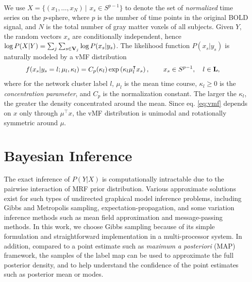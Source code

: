 \documentclass[review,authoryear]{elsarticle}
\begin{document}
We use $ X = \{ (x_1, \dots, x_N)\, |\, \ x_s \in S^{p-1} \}$ to denote the set
of \emph{normalized} time series on the $p$-sphere, where $p$ is the number of time
points in the original BOLD signal, and $N$ is the total number of gray matter
voxels of all subjects. Given $Y$, the random vectors $ x_s$ are conditionally
independent, hence $\log P( X | Y) = \sum_j \sum_{s \in \text{\bf V}_j} \log P (x_s | y_s)$.
The likelihood function $P( x_s | y_s)$ is naturally modeled by a vMF
distribution
\begin{align}
 f ( x_s| y_s = l; \mu_l, \kappa_l) &= C_p(\kappa_l) \exp \left(\kappa_l  \mu_l^{\intercal} x_s\right), \qquad  x_s \in S^{p-1},  \quad  l \in {\text{\bf L}},\label{eq:vmf}
\end{align}
where for the network cluster label $l$, $\mu_l$ is the mean time course,
$\kappa_l \geq 0$ is the \emph{concentration parameter}, and $C_p$ is the
normalization constant. The larger the $\kappa_l$, the greater the density
concentrated around the mean. Since eq. \eqref{eq:vmf} depends on $x$ only through
$\mu^{\intercal} x$, the vMF distribution is unimodal and rotationally symmetric around
$\mu$.

\section{Bayesian Inference}
\label{sec:inference}
The exact inference of $P(Y|X)$ is computationally intractable due to the
pairwise interaction of MRF prior distribution. Various approximate solutions
exist for such types of undirected graphical model inference problems, including
Gibbs and Metropolis sampling, expectation-propagation, and some variation
inference methods such as mean field approximation and message-passing
methods. In this work, we choose Gibbs sampling because of its simple
formulation and straightforward implementation in a multi-processor system. In
addition, compared to a point estimate such as \emph{maximum a posteriori} (MAP)
framework, the samples of the label map can be used to approximate the full
posterior density, and to help understand the confidence of the point estimates
such as posterior mean or modes.
\end{document}
